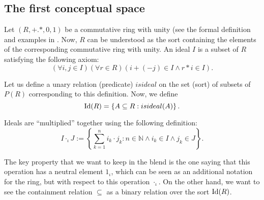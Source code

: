 

\subsection{The first conceptual space}
Let $(R,+.*,0,1)$ be a commutative ring with unity (see the formal
definition and examples in \cite{eisenbud}. Now, $R$ can be understood
as the sort containing the elements of the corresponding commutative
ring with unity.  An ideal $I$ is a subset of $R$ satisfying the
following axiom:
\[(\forall i,j\in I)(\forall r\in R)(i+(-j)\in I \wedge r*i\in I).\]

Let us define a unary relation (predicate) $isideal$
on the set (sort) of subsets of $P(R)$ corresponding to this definition.
Now, we define
\[{\rm Id}(R)=\left\{A\subseteq R: isideal(A) \right\}.\]

Ideals are ``multiplied'' together using the following definition:
%
%
\[I\cdot_{\iota} J:=\left\{\sum_{k=1}^ni_k\cdot j_k:n \in \mathbb{N} \wedge i_k\in I \wedge j_k\in J \right\}.\]

The key property that
we want to keep in the blend is the one saying that this operation
has a neutral element $1_{\iota}$, which can be seen as an additional
notation for the ring, but with respect to this operation $\cdot_{\iota}$.
%
On the other hand, we want to see the containment relation $\subseteq$
as a binary relation over the sort ${\rm Id}(R)$.

